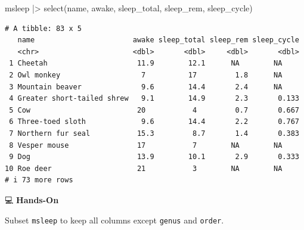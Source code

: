\documentclass[
  letterpaper,
  DIV=11,
  numbers=noendperiod]{scrreprt}
\newenvironment{Shaded}{\begin{snugshade}}{\end{snugshade}}
\newcommand{\FunctionTok}[1]{\textcolor[rgb]{0.28,0.35,0.67}{#1}}
\newcommand{\NormalTok}[1]{\textcolor[rgb]{0.00,0.23,0.31}{#1}}
\newcommand{\SpecialCharTok}[1]{\textcolor[rgb]{0.37,0.37,0.37}{#1}}
\begin{document}
\begin{tcolorbox}[enhanced jigsaw, colbacktitle=quarto-callout-tip-color!10!white, opacitybacktitle=0.6, breakable, left=2mm, leftrule=.75mm, toprule=.15mm, toptitle=1mm, bottomtitle=1mm, colframe=quarto-callout-tip-color-frame, opacityback=0, coltitle=black, arc=.35mm, titlerule=0mm, colback=white, bottomrule=.15mm, title=\textcolor{quarto-callout-tip-color}{\faLightbulb}\hspace{0.5em}{Answer}, rightrule=.15mm]

\begin{Shaded}
\begin{Highlighting}[]
\NormalTok{msleep }\SpecialCharTok{|\textgreater{}}
  \FunctionTok{select}\NormalTok{(name, awake, sleep\_total, sleep\_rem, sleep\_cycle)}
\end{Highlighting}
\end{Shaded}

\begin{verbatim}
# A tibble: 83 x 5
   name                       awake sleep_total sleep_rem sleep_cycle
   <chr>                      <dbl>       <dbl>     <dbl>       <dbl>
 1 Cheetah                     11.9        12.1      NA        NA    
 2 Owl monkey                   7          17         1.8      NA    
 3 Mountain beaver              9.6        14.4       2.4      NA    
 4 Greater short-tailed shrew   9.1        14.9       2.3       0.133
 5 Cow                         20           4         0.7       0.667
 6 Three-toed sloth             9.6        14.4       2.2       0.767
 7 Northern fur seal           15.3         8.7       1.4       0.383
 8 Vesper mouse                17           7        NA        NA    
 9 Dog                         13.9        10.1       2.9       0.333
10 Roe deer                    21           3        NA        NA    
# i 73 more rows
\end{verbatim}

\end{tcolorbox}

💻 \textbf{Hands-On}

Subset \texttt{msleep} to keep all columns except \texttt{genus} and
\texttt{order}.
\end{document}
